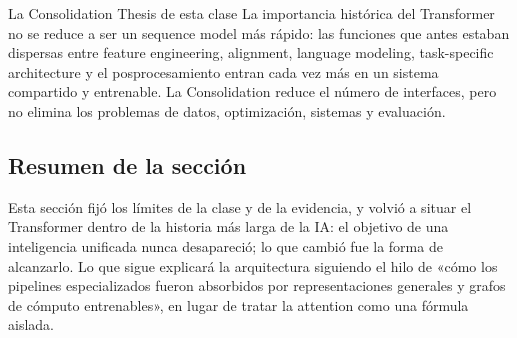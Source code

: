 
\begin{importantbox}{La Consolidation Thesis de esta clase}
La importancia histórica del Transformer no se reduce a ser un sequence model más rápido: las funciones que antes estaban dispersas entre feature engineering, alignment, language modeling, task-specific architecture y el posprocesamiento entran cada vez más en un sistema compartido y entrenable. La Consolidation reduce el número de interfaces, pero no elimina los problemas de datos, optimización, sistemas y evaluación.
\end{importantbox}

\subsection{Resumen de la sección}

Esta sección fijó los límites de la clase y de la evidencia, y volvió a situar el Transformer dentro de la historia más larga de la IA: el objetivo de una inteligencia unificada nunca desapareció; lo que cambió fue la forma de alcanzarlo. Lo que sigue explicará la arquitectura siguiendo el hilo de «cómo los pipelines especializados fueron absorbidos por representaciones generales y grafos de cómputo entrenables», en lugar de tratar la attention como una fórmula aislada.
